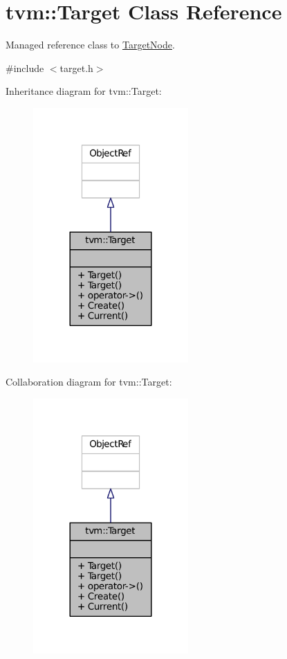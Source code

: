 \hypertarget{classtvm_1_1Target}{}\section{tvm\+:\+:Target Class Reference}
\label{classtvm_1_1Target}


Managed reference class to \hyperlink{classtvm_1_1TargetNode}{Target\+Node}.  




{\ttfamily \#include $<$target.\+h$>$}



Inheritance diagram for tvm\+:\+:Target\+:
\nopagebreak
\begin{figure}[H]
\begin{center}
\leavevmode
\includegraphics[width=168pt]{classtvm_1_1Target__inherit__graph}
\end{center}
\end{figure}


Collaboration diagram for tvm\+:\+:Target\+:
\nopagebreak
\begin{figure}[H]
\begin{center}
\leavevmode
\includegraphics[width=168pt]{classtvm_1_1Target__coll__graph}
\end{center}
\end{figure}
